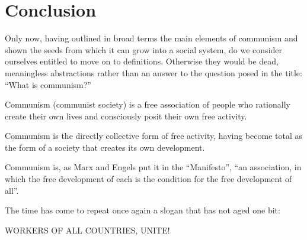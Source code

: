 \documentclass[../main]{subfiles}
\begin{document}
\ifSubfilesClassLoaded{\setcounter{page}{62}}{}
\section{Conclusion}
\label{sec:11_conclusion}

Only now, having outlined in broad terms the main elements of communism and shown the seeds from which it can grow into a social system, do we consider ourselves entitled to move on to definitions. Otherwise they would be dead, meaningless abstractions rather than an answer to the question posed in the title: “What is communism?”

Communism (communist society) is a free association of people who rationally create their own lives and consciously posit their own free activity.

Communism is the directly collective form of free activity, having become total as the form of a society that creates its own development.

Communism is, as Marx and Engels put it in the “Manifesto”, “an association, in which the free development of each is the condition for the free development of all”.

The time has come to repeat once again a slogan that has not aged one bit:

WORKERS OF ALL COUNTRIES, UNITE!
\end{document}
